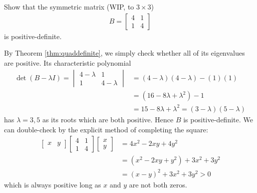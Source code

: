 \begin{exmp}
Show that the symmetric matrix (WIP, to $3 \times 3$)
\begin{align*}
B = 
\begin{bmatrix}
4 & 1 \\
1 & 4
\end{bmatrix}
\end{align*}
is positive-definite.
\end{exmp}
\begin{solution}
By Theorem \ref{thm:quaddefinite}, we simply check whether all of its eigenvalues are positive. Its characteristic polynomial
\begin{align*}
\det(B-\lambda I) =
\begin{vmatrix}
4 - \lambda & 1 \\
1 & 4 - \lambda
\end{vmatrix}
&= (4-\lambda)(4-\lambda) - (1)(1) \\
&= (16 - 8\lambda + \lambda^2) - 1 \\
&= 15 - 8\lambda + \lambda^2 = (3-\lambda)(5-\lambda)
\end{align*}
has $\lambda = 3,5$ as its roots which are both positive. Hence $B$ is positive-definite. We can double-check by the explicit method of completing the square:
\begin{align*}
\begin{bmatrix}
x & y
\end{bmatrix}
\begin{bmatrix}
4 & 1 \\
1 & 4
\end{bmatrix}
\begin{bmatrix}
x \\
y 
\end{bmatrix}
&= 4x^2 - 2xy + 4y^2 \\
&= (x^2 - 2xy + y^2) + 3x^2 + 3y^2 \\
&= (x-y)^2 + 3x^2 + 3y^2 > 0
\end{align*}
which is always positive long as $x$ and $y$ are not both zeros.
\end{solution}

